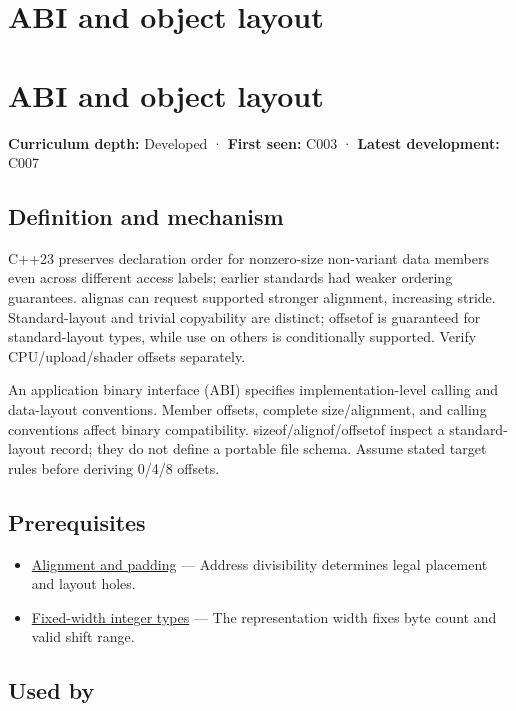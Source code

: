 \hypertarget{appendix-c4ac6bb0fff8}{}
\section*{ABI and object layout}
\section{ABI and object layout}\label{abi-and-object-layout}

\textbf{Curriculum depth:} Developed · \textbf{First seen:} C003 · \textbf{Latest development:} C007

\subsection{Definition and mechanism}\label{definition-and-mechanism}

C++23 preserves declaration order for nonzero-size non-variant data members even across different access labels; earlier standards had weaker ordering guarantees. alignas can request supported stronger alignment, increasing stride. Standard-layout and trivial copyability are distinct; offsetof is guaranteed for standard-layout types, while use on others is conditionally supported. Verify CPU/upload/shader offsets separately.

An application binary interface (ABI) specifies implementation-level calling and data-layout conventions. Member offsets, complete size/alignment, and calling conventions affect binary compatibility. sizeof/alignof/offsetof inspect a standard-layout record; they do not define a portable file schema. Assume stated target rules before deriving 0/4/8 offsets.

\subsection{Prerequisites}\label{prerequisites}

\begin{itemize}
\tightlist
\item
  \hyperref[appendix-a1f7c53b4742]{Alignment and padding} --- Address divisibility determines legal placement and layout holes.
\item
  \hyperref[appendix-cc04044b5782]{Fixed-width integer types} --- The representation width fixes byte count and valid shift range.
\end{itemize}

\subsection{Used by}\label{used-by}

